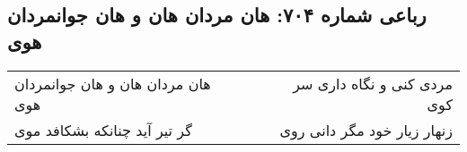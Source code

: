 \begin{center}
\section*{رباعی شماره ۷۰۴: هان مردان هان و هان جوانمردان هوی}
\label{sec:sh704}
\begin{longtable}{l p{0.5cm} r}
هان مردان هان و هان جوانمردان هوی
&&
مردی کنی و نگاه داری سر کوی
\\
گر تیر آید چنانکه بشکافد موی
&&
زنهار زیار خود مگر دانی روی
\\
\end{longtable}
\end{center}
